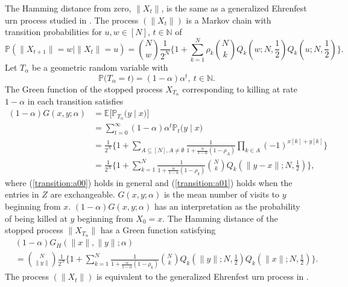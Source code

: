 \documentclass[preprint,11pt]{elsarticle}
\theoremstyle{remark}
\begin{document}
{The Hamming distance from zero, $\|X_t\|$, is the same as a generalized Ehrenfest urn process studied in 
\cite{DG2012}. The process $(\|X_t\|)$  is a Markov chain with transition probabilities for $u,w \in [N]$, $t\in \mathbb{N}$ of
\begin{equation*}
\mathbb{P}(\|X_{t+1}\|=w \mid \|X_t\|=u)
= {N\choose w}\frac{1}{2^N}\Big \{1 + \sum_{k=1}^N\rho_k{N\choose k}
Q_k(w;N,\frac{1}{2})Q_k(u;N,\frac{1}{2})\Big \}.
\label{transition:02}
\end{equation*}
Let $T_\alpha$ be a geometric random variable with
\begin{equation}
\mathbb{P}\big (T_\alpha = t) = (1-\alpha)\alpha^t,\ t\in \mathbb{N}.
\label{killing:00}
\end{equation}
The Green function of the stopped process $X_{T_{\alpha}}$ corresponding to killing at rate $1-\alpha$ in each transition satisfies
\begin{align}
(1-\alpha)G(x,y;\alpha)	%
& = \mathbb{E}\big [\mathbb{P}_{T_{\alpha}}\big (y\mid x)\big ]\nonumber \\
&= \sum_{t=0}^\infty(1-\alpha)\alpha^t\mathbb{P}_t\big (y\mid x)\nonumber \\
& = \frac{1}{2^N}\Big \{1 + \sum_{A\subseteq [N], A \ne \emptyset}
 \frac{1}{1 + \frac{\alpha}{1-\alpha}(1-\rho_A)}
 \prod_{k\in A}(-1)^{x[k]+y[k]}\Big \}
 \label{transition:a00}\\
 & = \frac{1}{2^N}\Big \{1 + \sum_{k=1}^N
 \frac{1}{1 + \frac{\alpha}{1-\alpha}(1-\rho_k)}
 {N\choose k}Q_k(\|y-x\|;N,\frac{1}{2})\Big \},
 \label{transition:a01}
\end{align}
where (\ref{transition:a00}) holds in general and (\ref{transition:a01}) holds when the entries in $Z$ are exchangeable. $G(x,y;\alpha)$ is the mean number of visits to $y$ beginning from $x$. $(1-\alpha)G(x,y;\alpha)$ has an interpretation as the probability of being killed at $y$ beginning from $X_0=x$.
The Hamming distance of the stopped process $\|X_{T_{\alpha}}\|$ has a Green function satisfying
\begin{align*}
&(1-\alpha)G_H(\|x\|,\|y\|;\alpha)		\nonumber \\
& = {N\choose \|y\|}\frac{1}{2^N}\Big \{1 + \sum_{k=1}^N
 \frac{1}{1 + \frac{\alpha}{1-\alpha}(1-\rho_k)}
 {N\choose k}Q_k(\|y\|;N,\frac{1}{2})Q_k(\|x\|;N,\frac{1}{2})\Big \}.
 \label{transition:b01}
\end{align*}
The process $(\|X_t\|)$ is equivalent to the generalized Ehrenfest urn process in \cite{DG2012}.


}
\end{document}
